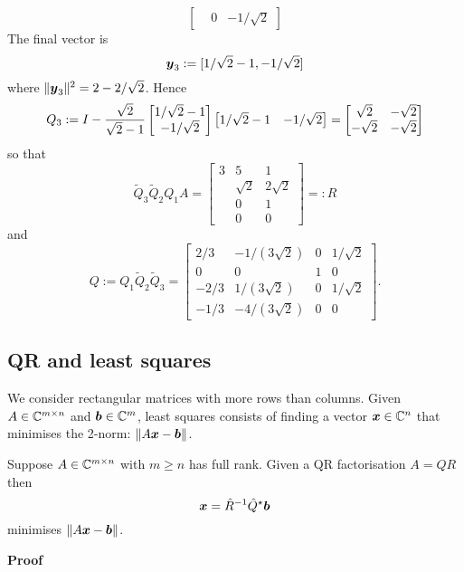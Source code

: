 \begin{example}
\[\begin{bmatrix}
& 0 & -1/\sqrt{2}
\end{bmatrix}
\]
The final vector is 
\[
\bm{{\mbox{\boldmath$y$\unboldmath}}}_3 := [1/\sqrt{2}-1,-1/\sqrt{2}]
\]
where $\| \bm{{\mbox{\boldmath$y$\unboldmath}}}_3 \|^2 = 2 - 2/\sqrt{2}$. Hence
\[
Q_3 := I - {\sqrt{2} \over \sqrt{2} - 1} \begin{bmatrix}
1/\sqrt{2}-1 \\
-1/\sqrt{2}
\end{bmatrix} \begin{bmatrix}
1/\sqrt{2}-1 &
-1/\sqrt{2}
\end{bmatrix} =
\begin{bmatrix}
\sqrt{2} & -\sqrt{2}\\
-\sqrt{2} & -\sqrt{2}
\end{bmatrix}
\]
so that 
\[
\tilde Q_3 \tilde Q_2 Q_1 A = \begin{bmatrix} 3 & 5 & 1 \\
 & \sqrt{2} & 2\sqrt{2} \\
  & 0 & 1 \\
& 0 & 0
\end{bmatrix} =: R
\]
and
\[
Q := Q_1 \tilde Q_2 \tilde Q_3 =  \begin{bmatrix}
2/3 & -1/(3\sqrt{2}) & 0 & 1/\sqrt{2} \\
0 &  0 & 1 & 0 \\
-2/3 & 1/(3\sqrt{2}) & 0 & 1/\sqrt{2} \\ 
-1/3 & - 4/(3\sqrt{2}) & 0 & 0
\end{bmatrix}.
\]
\subsection{QR and least squares}
We consider rectangular matrices with more rows than columns. Given $A \in {\mathbb C}^{m \times n}$ and $\bm{{\mbox{\boldmath$b$\unboldmath}}} \in {\mathbb C}^m$, least squares consists of finding a vector $\bm{{\mbox{\boldmath$x$\unboldmath}}} \in {\mathbb C}^n$ that minimises the 2-norm: $\| A \bm{{\mbox{\boldmath$x$\unboldmath}}} - \bm{{\mbox{\boldmath$b$\unboldmath}}} \|$.

\begin{theorem} Suppose $A \in {\mathbb C}^{m \times n}$ with $m \ensuremath{\geq} n$ has full rank. Given a QR factorisation $A = Q R$ then
\[
\bm{{\mbox{\boldmath$x$\unboldmath}}} = \hat R^{-1} \hat Q^\star \bm{{\mbox{\boldmath$b$\unboldmath}}}
\]
minimises $\| A \bm{{\mbox{\boldmath$x$\unboldmath}}} - \bm{{\mbox{\boldmath$b$\unboldmath}}} \|$. 

\end{theorem}
\textbf{Proof}


\end{example}
